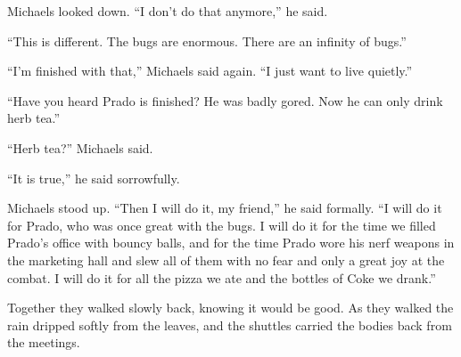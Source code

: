 Michaels looked down. ``I don't do that anymore,'' he said.

``This is different. The bugs are enormous. There are an infinity of
bugs.''

``I'm finished with that,'' Michaels said again. ``I just want to live
quietly.''

``Have you heard Prado is finished? He was badly gored. Now he can only
drink herb tea.''

``Herb tea?'' Michaels said.

``It is true,'' he said sorrowfully.

Michaels stood up. ``Then I will do it, my friend,'' he said
formally. ``I will do it for Prado, who was once great with the bugs. I
will do it for the time we filled Prado's office with bouncy balls,
and for the time Prado wore his nerf weapons in the marketing hall and
slew all of them with no fear and only a great joy at the combat. I
will do it for all the pizza we ate and the bottles of Coke we drank.''

Together they walked slowly back, knowing it would be good. As they
walked the rain dripped softly from the leaves, and the shuttles
carried the bodies back from the meetings.
\bye
